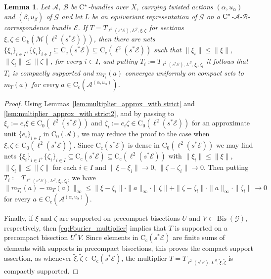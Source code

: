 \documentclass[11 pt, leqno]{amsart}
\numberwithin{equation}{section}
\theoremstyle{plain}
\newtheorem {lem} [thm]{Lemma}
\theoremstyle{definition}
\newcommand*{\contc}{\mathrm{C_c}}%
\newcommand*{\contz}{\mathrm{C_0}}%
\newcommand*{\contb}{\mathrm{C_b}}%
\DeclareMathOperator{\Bis}{Bis}
\newcommand{\B}{\mathcal B}
\newcommand{\M}{\mathcal M}
\newcommand{\m}{m}
\newcommand{\G}{\mathcal G} %
\newcommand{\EE}{\mathcal E}
\newcommand{\A}{\mathcal A}
\newcommand{\cst}{\ifmmode\mathrm{C}^*\else{$\mathrm{C}^*$}\fi}
\begin{document}
\begin{lem}\label{lem:Fourier_explicite_approximation}
Let $\A$, $\B$  be $\cst$-bundles over $X$, carrying twisted actions $(\alpha,u_\alpha)$ and $(\beta,u_\beta)$ of $\G$ and let $L$ be an equivariant representation of $\G$ on a $\cst$-$\A$-$\B$-correspondence bundle $\EE$. 
If $T=T_{\ell^2(s^*\EE) , L^\G , \xi , \zeta}$ for sections $\xi,\zeta\in \contb(\M(\ell^2(s^*\EE)))$, then there are nets $\{\xi_i\}_{i\in I}, \{\zeta_i\}_{i \in I} \subseteq  \contc(s^*\EE) \subseteq \contc(\ell^2(s^*\EE))$ such that  $\| \xi_i \| \leq \|\xi\|$, $\|\zeta_i\|\leq \|\zeta\|$, for every $i \in I$, and putting $T_i:=T_{\ell^2(s^*\EE) , L^\G , \xi_i , \zeta_i}$ it follows that $T_i$ is compactly supported and
$\m_{T_i}(a)$ converges uniformly on compact sets to $\m_{T}(a)$ for every $a\in\contc(\A^{(\alpha,u_{\alpha})})$.  
\end{lem}
\begin{proof}
Using Lemmas~\ref{lem:multiplier_approx_with strict} and \ref{lem:multiplier_approx_with strict2}, and by passing to $\xi_i:= e_i \xi \in \contz(\ell^2(s^*\EE))$ and $\zeta_i := e_i \zeta\in \contz(\ell^2(s^*\EE))$ for an approximate unit $\{e_i\}_{i\in I}$ in $\contz(\A)$, we may reduce the proof to the case when $\xi , \zeta \in \contz(\ell^2(s^*\EE))$. 
Since $\contc(s^*\EE)$ is dense in $\contz(\ell^2(s^*\EE))$ we may find nets $\{\xi_i\}_{i \in I}, \{\zeta_i\}_{i \in I}\subseteq \contc(s^*\EE)\subseteq \contc(\ell^2(s^*\EE))$ with $\| \xi_i \| \leq \| \xi \|$, $\|\zeta_i\|\leq \|\zeta\|$ for each $i \in I$ and $\|\xi-\xi_i\|\to 0$, $\|\zeta-\zeta_i\|\to 0$. 
Then putting $T_i:=T_{\ell^2(s^*\EE) , L^\G , \xi_i , \zeta_i}$, we have 
\[
    \| \m_{T_i}(a) - \m_{T}(a) \|_{\infty} \leq \| \xi - \xi_i \| \cdot \| a \|_{\infty} \cdot \| \zeta \| + \|\zeta-\zeta_i\| \cdot \| a \|_{\infty} \cdot \| \zeta_i \| \to 0 
\]
for every $a\in\contc(\A^{(\alpha,u_{\alpha})})$. 

Finally, if $\xi$ and $\zeta$ are supported on precompact bisections $U$ and $V\in\Bis(\G)$, respectively, then \eqref{eq:Fourier_multiplier} implies that $T$ is supported on a precompact bisection $U^*V$. 
Since elements in $\contc(s^*\EE)$ are finite sums of elements with supports in precompact bisections, this proves the compact support assertion, as whenever $\tilde\xi,\tilde\zeta \in  \contc(s^*\EE)$, the multiplier $T=T_{\ell^2(s^*\EE) , L^\G , \tilde\xi , \tilde\zeta}$ is compactly supported.
\end{proof}
\end{document}
